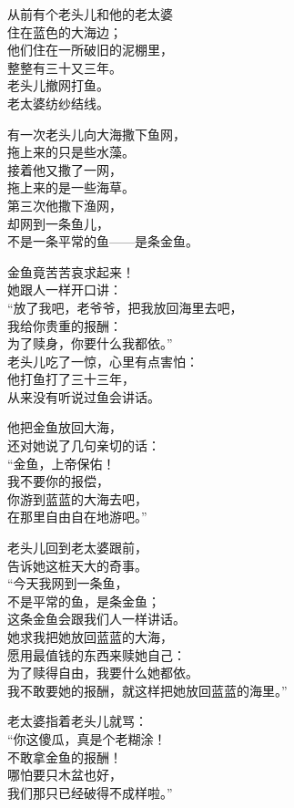 \documentclass[
]{book}
\renewenvironment{quote}{\begin{VF}}{\end{VF}}
\begin{document}
\begin{quote}
从前有个老头儿和他的老太婆\\
住在蓝色的大海边；\\
他们住在一所破旧的泥棚里，\\
整整有三十又三年。\\
老头儿撤网打鱼。\\
老太婆纺纱结线。

有一次老头儿向大海撒下鱼网，\\
拖上来的只是些水藻。\\
接着他又撒了一网，\\
拖上来的是一些海草。\\
第三次他撒下渔网，\\
却网到一条鱼儿，\\
不是一条平常的鱼------是条金鱼。

金鱼竟苦苦哀求起来！\\
她跟人一样开口讲：\\
``放了我吧，老爷爷，把我放回海里去吧，\\
我给你贵重的报酬：\\
为了赎身，你要什么我都依。''\\
老头儿吃了一惊，心里有点害怕：\\
他打鱼打了三十三年，\\
从来没有听说过鱼会讲话。

他把金鱼放回大海，\\
还对她说了几句亲切的话：\\
``金鱼，上帝保佑！\\
我不要你的报偿，\\
你游到蓝蓝的大海去吧，\\
在那里自由自在地游吧。''

老头儿回到老太婆跟前，\\
告诉她这桩天大的奇事。\\
``今天我网到一条鱼，\\
不是平常的鱼，是条金鱼；\\
这条金鱼会跟我们人一样讲话。\\
她求我把她放回蓝蓝的大海，\\
愿用最值钱的东西来赎她自己：\\
为了赎得自由，我要什么她都依。\\
我不敢要她的报酬，就这样把她放回蓝蓝的海里。''

老太婆指着老头儿就骂：\\
``你这傻瓜，真是个老糊涂！\\
不敢拿金鱼的报酬！\\
哪怕要只木盆也好，\\
我们那只已经破得不成样啦。''


\end{quote}
\end{document}
